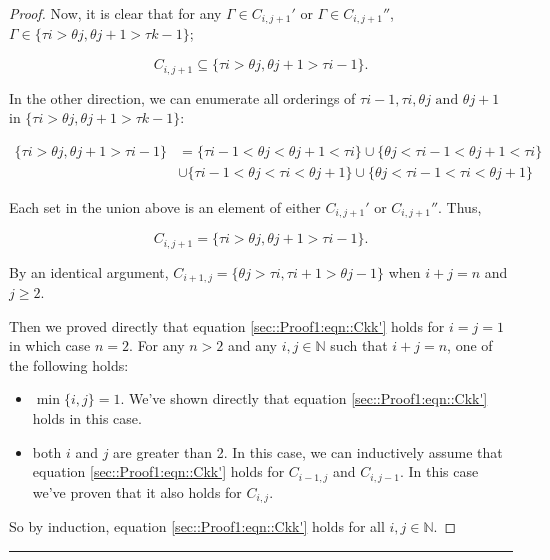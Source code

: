 \documentclass[12pt]{article}
\newcommand{\mb}{\mathbb}
\newcommand{\te}{\text}
\newcommand{\lin}{\rule{\linewidth}{0.4 pt}}
\newcommand{\rt}{\tau}							%
\newcommand{\rtt}{\theta}						%
\renewcommand{\it}{k}							%
\newcommand{\apath}{\Gamma}						%
\newcommand{\pathsete}[2]{C_{#1,#2}}			%
\begin{document}
\begin{proof}
Now, it is clear that for any \(\apath{} \in \pathsete{i}{j+1}'\) or \(\apath{} \in \pathsete{i}{j+1}''\), \(\apath{}\in \{\rt{i} > \rtt{j},\rtt{j+1} > \rt{\it-1}\}\);

\[\pathsete{i}{j+1} \subseteq \{\rt{i} > \rtt{j},\rtt{j+1} > \rt{i-1}\}.\]

In the other direction, we can enumerate all orderings of \(\rt{i-1},\rt{i},\rtt{j}\te{ and } \rtt{j+1}\) in \(\{\rt{i} > \rtt{j}, \rtt{j+1} > \rt{\it-1}\}\):

\begin{align*}
\{\rt{i} > \rtt{j},\rtt{j+1} > \rt{i-1}\} &= \{\rt{i-1} < \rtt{j} < \rtt{j+1} < \rt{i}\} \cup \{\rtt{j} < \rt{i-1} < \rtt{j+1} < \rt{i}\}\\
&\cup \{\rt{i-1} < \rtt{j} < \rt{i} < \rtt{j+1}\} \cup \{\rtt{j} < \rt{i-1} <\rt{i} < \rtt{j+1}\}
\end{align*}

Each set in the union above is an element of either \(\pathsete{i}{j+1}'\) or \(\pathsete{i}{j+1}''\). Thus,

\[\pathsete{i}{j+1} = \{\rt{i} > \rtt{j},\rtt{j+1} > \rt{i-1}\}.\]

By an identical argument, \(\pathsete{i+1}{j} = \{\rtt{j} > \rt{i},\rt{i+1} > \rtt{j-1}\}\) when \(i + j = n\) and \(j \geq 2\).

Then we proved directly that equation \eqref{sec::Proof1:eqn::Ckk'} holds for \(i = j=1\) in which case \(n = 2\). For any \(n > 2\) and any \(i,j\in \mb{N}\) such that \(i + j = n\), one of the following holds:

\begin{itemize}
\item \(\min\{i,j\} = 1\). We've shown directly that equation \eqref{sec::Proof1:eqn::Ckk'} holds in this case.

\item both \(i\) and \(j\) are greater than 2. In this case, we can inductively assume that equation \eqref{sec::Proof1:eqn::Ckk'} holds for \(\pathsete{i-1}{j}\) and \(\pathsete{i}{j-1}\). In this case we've proven that it also holds for \(\pathsete{i}{j}\).
\end{itemize}

So by induction, equation \eqref{sec::Proof1:eqn::Ckk'} holds for all \(i,j\in \mb{N}\).
\end{proof}

\lin
\end{document}
